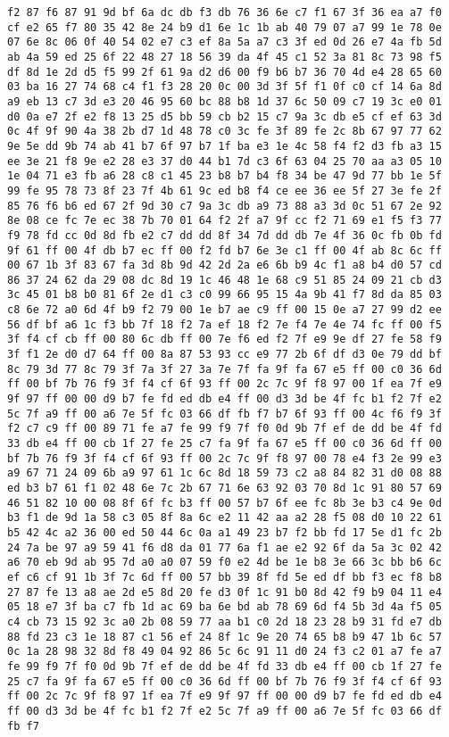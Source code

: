 \documentclass{article}
\begin{document}
\begin{verbatim}
f2 87 f6 87 91 9d bf 6a dc db f3 db 76 36 6e c7 f1 67 3f 36 ea a7 f0 cf e2 65 f7 80 35 42 8e 24 b9 d1 6e 1c 1b ab 40 79 07 a7 99 1e 78 0e 07 6e 8c 06 0f 40 54 02 e7 c3 ef 8a 5a a7 c3 3f ed 0d 26 e7 4a fb 5d ab 4a 59 ed 25 6f 22 48 27 18 56 39 da 4f 45 c1 52 3a 81 8c 73 98 f5 df 8d 1e 2d d5 f5 99 2f 61 9a d2 d6 00 f9 b6 b7 36 70 4d e4 28 65 60 03 ba 16 27 74 68 c4 f1 f3 28 20 0c 00 3d 3f 5f f1 0f c0 cf 14 6a 8d a9 eb 13 c7 3d e3 20 46 95 60 bc 88 b8 1d 37 6c 50 09 c7 19 3c e0 01 d0 0a e7 2f e2 f8 13 25 d5 bb 59 cb b2 15 c7 9a 3c db e5 cf ef 63 3d 0c 4f 9f 90 4a 38 2b d7 1d 48 78 c0 3c fe 3f 89 fe 2c 8b 67 97 77 62 9e 5e dd 9b 74 ab 41 b7 6f 97 b7 1f ba e3 1e 4c 58 f4 f2 d3 fb a3 15 ee 3e 21 f8 9e e2 28 e3 37 d0 44 b1 7d c3 6f 63 04 25 70 aa a3 05 10 1e 04 71 e3 fb a6 28 c8 c1 45 23 b8 b7 b4 f8 34 be 47 9d 77 bb 1e 5f 99 fe 95 78 73 8f 23 7f 4b 61 9c ed b8 f4 ce ee 36 ee 5f 27 3e fe 2f 85 76 f6 b6 ed 67 2f 9d 30 c7 9a 3c db a9 73 88 a3 3d 0c 51 67 2e 92 8e 08 ce fc 7e ec 38 7b 70 01 64 f2 2f a7 9f cc f2 71 69 e1 f5 f3 77 f9 78 fd cc 0d 8d fb e2 c7 dd dd 8f 34 7d dd db 7e 4f 36 0c fb 0b fd 9f 61 ff 00 4f db b7 ec ff 00 f2 fd b7 6e 3e c1 ff 00 4f ab 8c 6c ff 00 67 1b 3f 83 67 fa 3d 8b 9d 42 2d 2a e6 6b b9 4c f1 a8 b4 d0 57 cd 86 37 24 62 da 29 08 dc 8d 19 1c 46 48 1e 68 c9 51 85 24 09 21 cb d3 3c 45 01 b8 b0 81 6f 2e d1 c3 c0 99 66 95 15 4a 9b 41 f7 8d da 85 03 c8 6e 72 a0 6d 4f b9 f2 79 00 1e b7 ae c9 ff 00 15 0e a7 27 99 d2 ee 56 df bf a6 1c f3 bb 7f 18 f2 7a ef 18 f2 7e f4 7e 4e 74 fc ff 00 f5 3f f4 cf cb ff 00 80 6c db ff 00 7e f6 ed f2 7f e9 9e df 27 fe 58 f9 3f f1 2e d0 d7 64 ff 00 8a 87 53 93 cc e9 77 2b 6f df d3 0e 79 dd bf 8c 79 3d 77 8c 79 3f 7a 3f 27 3a 7e 7f fa 9f fa 67 e5 ff 00 c0 36 6d ff 00 bf 7b 76 f9 3f f4 cf 6f 93 ff 00 2c 7c 9f f8 97 00 1f ea 7f e9 9f 97 ff 00 00 d9 b7 fe fd ed db e4 ff 00 d3 3d be 4f fc b1 f2 7f e2 5c 7f a9 ff 00 a6 7e 5f fc 03 66 df fb f7 b7 6f 93 ff 00 4c f6 f9 3f f2 c7 c9 ff 00 89 71 fe a7 fe 99 f9 7f f0 0d 9b 7f ef de dd be 4f fd 33 db e4 ff 00 cb 1f 27 fe 25 c7 fa 9f fa 67 e5 ff 00 c0 36 6d ff 00 bf 7b 76 f9 3f f4 cf 6f 93 ff 00 2c 7c 9f f8 97 00 78 e4 f3 2e 99 e3 a9 67 71 24 09 6b a9 97 61 1c 6c 8d 18 59 73 c2 a8 84 82 31 d0 08 88 ed b3 b7 61 f1 02 48 6e 7c 2b 67 71 6e 63 92 03 70 8d 1c 91 80 57 69 46 51 82 10 00 08 8f 6f fc b3 ff 00 57 b7 6f ee fc 8b 3e b3 c4 9e 0d b3 f1 de 9d 1a 58 c3 05 8f 8a 6c e2 11 42 aa a2 28 f5 08 d0 10 22 61 b5 42 4c a2 36 00 ed 50 44 6c 0a a1 49 23 b7 f2 bb fd 17 5e d1 fc 2b 24 7a be 97 a9 59 41 f6 d8 da 01 77 6a f1 ae e2 92 6f da 5a 3c 02 42 a6 70 eb 9d ab 95 7d a0 a0 07 59 f0 e2 4d be 1e b8 3e 66 3c bb b6 6c ef c6 cf 91 1b 3f 7c 6d ff 00 57 bb 39 8f fd 5e ed df bb f3 ec f8 b8 27 87 fe 13 a8 ae 2d e5 8d 20 fe d3 0f 1c 91 b0 8d 42 f9 b9 04 11 e4 05 18 e7 3f ba c7 fb 1d ac 69 ba 6e bd ab 78 69 6d f4 5b 3d 4a f5 05 c4 cb 73 15 92 3c a0 2b 08 59 77 aa b1 c0 2d 18 23 28 b9 31 fd e7 db 88 fd 23 c3 1e 18 87 c1 56 ef 24 8f 1c 9e 20 74 65 b8 b9 47 1b 6c 57 0c 1a 28 98 32 8d f8 49 04 92 86 5c 6c 91 11 d0 24 f3 c2 01 a7 fe a7 fe 99 f9 7f f0 0d 9b 7f ef de dd be 4f fd 33 db e4 ff 00 cb 1f 27 fe 25 c7 fa 9f fa 67 e5 ff 00 c0 36 6d ff 00 bf 7b 76 f9 3f f4 cf 6f 93 ff 00 2c 7c 9f f8 97 1f ea 7f e9 9f 97 ff 00 00 d9 b7 fe fd ed db e4 ff 00 d3 3d be 4f fc b1 f2 7f e2 5c 7f a9 ff 00 a6 7e 5f fc 03 66 df fb f7 
\end{verbatim}
\end{document}
